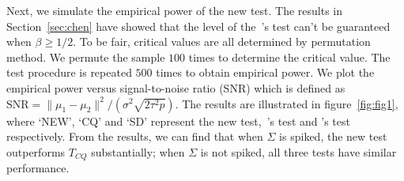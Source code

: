 \documentclass[review]{elsarticle}
\theoremstyle{plain}
\theoremstyle{definition}
\theoremstyle{remark}
\begin{document}
Next, we simulate the empirical power of the new test.
The results in Section~\ref{sec:chen} have showed that the level of the~\cite{Chen2010A}'s test can't be guaranteed when $\beta\geq 1/2$.
To be fair,  critical values are all determined by permutation method.
We permute the sample $100$ times to determine the critical value. The test procedure is repeated $500$ times to obtain empirical power.
We plot the empirical power versus signal-to-noise ratio (SNR) which is defined as $\textrm{SNR}=\|\mu_1-\mu_2\|^2/(\sigma^2\sqrt{2\tau^2 p})$.
The results are illustrated in figure~\ref{fig:fig1}, where `NEW', `CQ' and `SD' represent the new test,~\cite{Chen2010A}'s test and \cite{Srivastava2008A}'s test respectively.
From the results, we can find that when $\Sigma$ is spiked, the new test outperforms $T_{CQ}$ substantially; when $\Sigma$ is not spiked, all three tests have similar performance.
\end{document}
